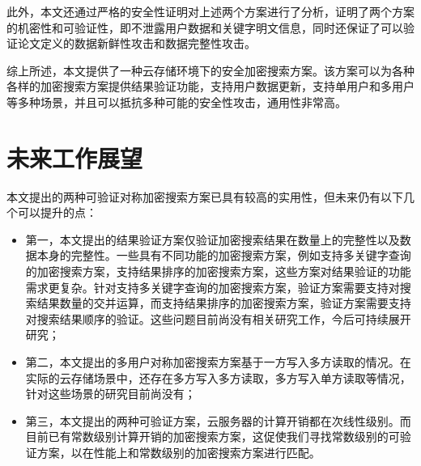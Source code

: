 此外，本文还通过严格的安全性证明对上述两个方案进行了分析，证明了两个方案的机密性和可验证性，即不泄露用户数据和关键字明文信息，同时还保证了可以验证论文定义的数据新鲜性攻击和数据完整性攻击。

综上所述，本文提供了一种云存储环境下的安全加密搜索方案。该方案可以为各种各样的加密搜索方案提供结果验证功能，支持用户数据更新，支持单用户和多用户等多种场景，并且可以抵抗多种可能的安全性攻击，通用性非常高。

\section{未来工作展望}
本文提出的两种可验证对称加密搜索方案已具有较高的实用性，但未来仍有以下几个可以提升的点：
\begin{itemize}
  \item 第一，本文提出的结果验证方案仅验证加密搜索结果在数量上的完整性以及数据本身的完整性。一些具有不同功能的加密搜索方案，例如支持多关键字查询的加密搜索方案，支持结果排序的加密搜索方案，这些方案对结果验证的功能需求更复杂。针对支持多关键字查询的加密搜索方案，验证方案需要支持对搜索结果数量的交并运算，而支持结果排序的加密搜索方案，验证方案需要支持对搜索结果顺序的验证。这些问题目前尚没有相关研究工作，今后可持续展开研究；
  \item 第二，本文提出的多用户对称加密搜索方案\multi 基于一方写入多方读取的情况。在实际的云存储场景中，还存在多方写入多方读取，多方写入单方读取等情况，针对这些场景的研究目前尚没有；
  \item 第三，本文提出的两种可验证方案，云服务器的计算开销都在次线性级别。而目前已有常数级别计算开销的加密搜索方案，这促使我们寻找常数级别的可验证方案，以在性能上和常数级别的加密搜索方案进行匹配。
\end{itemize}
